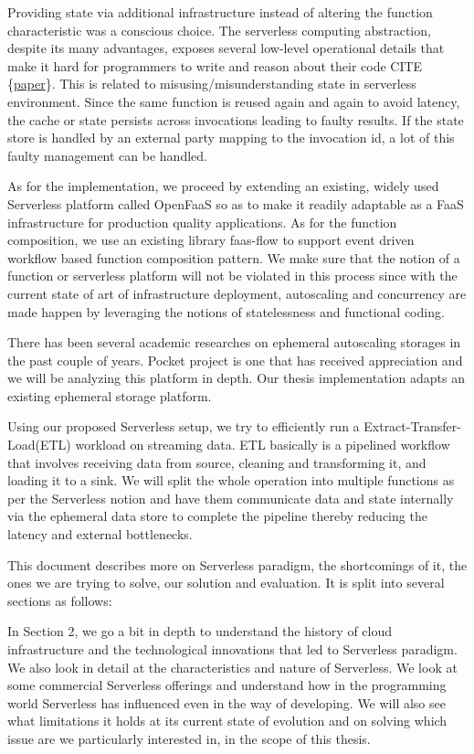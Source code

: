 \documentclass[12pt,titlepage]{article}
\begin{document}
Providing state via additional infrastructure instead of altering the function
characteristic was a conscious choice. The serverless computing abstraction,
despite its many advantages, exposes several low-level operational  details that
make it hard for programmers to write and reason about their code CITE \{\href{https://arxiv.org/pdf/1902.05870.pdf}{paper}\}. This is
related to misusing/misunderstanding state in serverless environment. Since
the same function is reused again and again to avoid latency, the cache or state
persists across invocations leading to faulty results. If the state store is
handled by an external party mapping to the invocation id, a lot of this faulty
management can be handled.

As for the implementation, we proceed by extending an existing, widely used
Serverless platform called OpenFaaS so as to make it readily adaptable as a FaaS
infrastructure for production quality applications. As for the function
composition, we use an existing library faas-flow to support event driven
workflow based function composition pattern. We make sure that the notion of a
function or serverless platform will not be violated in this process since with
the current state of art of infrastructure deployment, autoscaling and
concurrency are made happen by leveraging the notions of statelessness and functional coding.

There has been several academic researches on ephemeral autoscaling storages in
the past couple of years. Pocket project is one that has received appreciation
and we will be analyzing this platform in depth. Our thesis implementation
adapts an existing ephemeral storage platform.

Using our proposed Serverless setup, we try to efficiently run a
Extract-Transfer-Load(ETL) workload on streaming data. ETL basically is a
pipelined workflow that involves receiving data
from source, cleaning and transforming it, and loading it to a sink. We will
split the whole operation into multiple functions as per the Serverless notion
and have them communicate data and state internally via the ephemeral data store
to complete the pipeline thereby reducing the latency and external bottlenecks.

This document describes more on Serverless paradigm, the shortcomings of it, the
ones we are trying to solve, our solution and evaluation. It is split into
several sections as follows:

In Section 2, we go a bit in depth to understand the history of cloud
infrastructure and the technological innovations that led to Serverless
paradigm. We also look in detail at the characteristics and nature of
Serverless. We look at some commercial Serverless offerings and understand how
in the programming world Serverless has influenced even in the way of developing.
We will also see what limitations it holds at its current state of evolution and
on solving which issue are we particularly interested in, in the scope of this
thesis.
\end{document}
